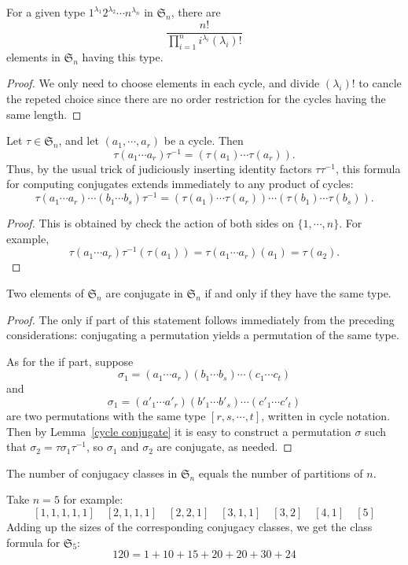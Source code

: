 \begin{proposition}
For a given type $1^{\lambda_1}2^{\lambda_2}\cdots n^{\lambda_n}$ in $\mathfrak{S}_n$, there are
\[\frac{n!}{\prod_{i=1}^{n}i^{\lambda_i}(\lambda_i)!}\]
elements in $\mathfrak{S}_n$ having this type.
\end{proposition}
\begin{proof}
We only need to choose elements in each cycle, and divide $(\lambda_i)!$ to cancle the repeted choice since there are no order restriction for the cycles having the same length.
\end{proof}
\begin{lemma}\label{cycle conjugate}
Let $\tau\in\mathfrak{S}_n$, and let $(a_1,\cdots,a_r)$ be a cycle. Then
\[\tau(a_1\cdots a_r)\tau^{-1}=(\tau(a_1)\cdots\tau(a_r)).\]
Thus, by the usual trick of judiciously inserting identity factors $\tau\tau^{-1}$, this formula for computing conjugates extends immediately to any product of cycles:
\[\tau(a_1\cdots a_r)\cdots(b_1\cdots b_s)\tau^{-1}=(\tau(a_1)\cdots\tau(a_r))\cdots(\tau(b_1)\cdots\tau(b_s)).\]
\end{lemma}
\begin{proof}
This is obtained by check the action of both sides on $\{1,\cdots,n\}$. For example,
\[\tau(a_1\cdots a_r)\tau^{-1}(\tau(a_1))=\tau(a_1\cdots a_r)(a_1)=\tau(a_2).\]
\end{proof}
\begin{proposition}
Two elements of $\mathfrak{S}_n$ are conjugate in $\mathfrak{S}_n$ if and only if they have the same type.
\end{proposition}
\begin{proof}
The only if part of this statement follows immediately from the preceding
considerations: conjugating a permutation yields a permutation of the same type.\par
As for the if part, suppose
\[\sigma_1=(a_1\cdots a_r)(b_1\cdots b_s)\cdots(c_1\cdots c_t)\]
and
\[\sigma_1=(a'_1\cdots a'_r)(b'_1\cdots b'_s)\cdots(c'_1\cdots c'_t)\]
are two permutations with the same type $[r,s,\cdots,t]$, written in cycle notation. Then by Lemma~\ref{cycle conjugate} it is easy to construct a permutation $\sigma$ such that $\sigma_2=\tau\sigma_1\tau^{-1}$, so $\sigma_1$ and $\sigma_2$ are conjugate, as needed.
\end{proof}
\begin{corollary}
The number of conjugacy classes in $\mathfrak{S}_n$ equals the number of partitions of $n$.
\end{corollary}
\begin{example}
Take $n=5$ for example:
\[[1,1,1,1,1]\quad [2,1,1,1]\quad [2,2,1]\quad[3,1,1]\quad[3,2]\quad[4,1]\quad[5]\]
Adding up the sizes of the corresponding conjugacy classes, we get the class formula for $\mathfrak{S}_5$:
\[120=1+10+15+20+20+30+24\]
\end{example}
